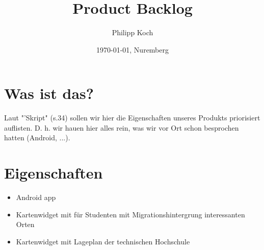 \documentclass[12pt]{scrartcl}
\title{Product Backlog}
\author{Philipp Koch}
\date{\today{}, Nuremberg}
\begin{document}
\maketitle
\section{Was ist das?}
Laut "'Skript" (s.34) sollen wir hier die Eigenschaften unseres Produkts priorisiert auflisten. D. h. wir hauen hier alles rein, was wir vor Ort schon besprochen hatten (Android, ...).
\section{Eigenschaften}
\begin{itemize}
\item{Android app}
\item{Kartenwidget mit für Studenten mit Migrationshintergrung interessanten Orten}
\item Kartenwidget mit Lageplan der technischen Hochschule

\end{itemize}
\end{document}
